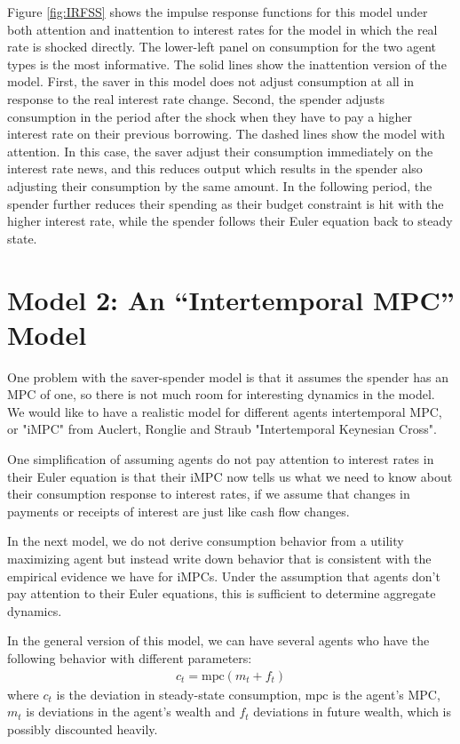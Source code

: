\documentclass[AER]{AEA}
\begin{document}
Figure \ref{fig:IRFSS} shows the impulse response functions for this model under both attention and inattention to interest rates for the model in which the real rate is shocked directly. The lower-left panel on consumption for the two agent types is the most informative. The solid lines show the inattention version of the model. First, the saver in this model does not adjust consumption at all in response to the real interest rate change. Second, the spender adjusts consumption in the period after the shock when they have to pay a higher interest rate on their previous borrowing. The dashed lines show the model with attention. In this case, the saver adjust their consumption immediately on the interest rate news, and this reduces output which results in the spender also adjusting their consumption by the same amount. In the following period, the spender further reduces their spending as their budget constraint is hit with the higher interest rate, while the spender follows their Euler equation back to steady state.

\section{Model 2: An ``Intertemporal MPC'' Model}

One problem with the saver-spender model is that it assumes the spender has an MPC of one, so there is not much room for interesting dynamics in the model. We would like to have a realistic model for different agents intertemporal MPC, or "iMPC" from Auclert, Ronglie and Straub "Intertemporal Keynesian Cross". 

One simplification of assuming agents do not pay attention to interest rates in their Euler equation is that their iMPC now tells us what we need to know about their consumption response to interest rates, if we assume that changes in payments or receipts of interest are just like cash flow changes.

In the next model, we do not derive consumption behavior from a utility maximizing agent but instead write down behavior that is consistent with the empirical evidence we have for iMPCs. Under the assumption that agents don't pay attention to their Euler equations, this is sufficient to determine aggregate dynamics.

In the general version of this model, we can have several agents who have the following behavior with different parameters:
\begin{align}
	c_t = \text{mpc} (m_t + f_t)
\end{align}
where $c_t$ is the deviation in steady-state consumption, $\text{mpc}$ is the agent's MPC, $m_t$ is deviations in the agent's wealth and $f_t$ deviations in future wealth, which is possibly discounted heavily.
\end{document}
